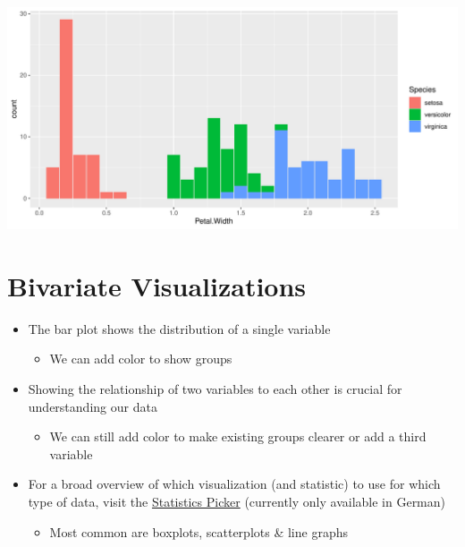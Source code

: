 \documentclass[
]{book}
\providecommand{\tightlist}{%
  \setlength{\itemsep}{0pt}\setlength{\parskip}{0pt}}
\begin{document}
\begin{flushleft}\includegraphics{_main_files/figure-latex/unnamed-chunk-50-1} \end{flushleft}

\section{Bivariate Visualizations}\label{bivariate-visualizations}

\begin{itemize}
\tightlist
\item
  The bar plot shows the distribution of a single variable

  \begin{itemize}
  \tightlist
  \item
    We can add color to show groups
  \end{itemize}
\item
  Showing the relationship of two variables to each other is crucial for understanding our data

  \begin{itemize}
  \tightlist
  \item
    We can still add color to make existing groups clearer or add a third variable
  \end{itemize}
\item
  For a broad overview of which visualization (and statistic) to use for which type of data, visit the \href{https://the-tave.shinyapps.io/Statistics-Picker/}{Statistics Picker} (currently only available in German)

  \begin{itemize}
  \tightlist
  \item
    Most common are boxplots, scatterplots \& line graphs
  \end{itemize}
\end{itemize}
\end{document}
